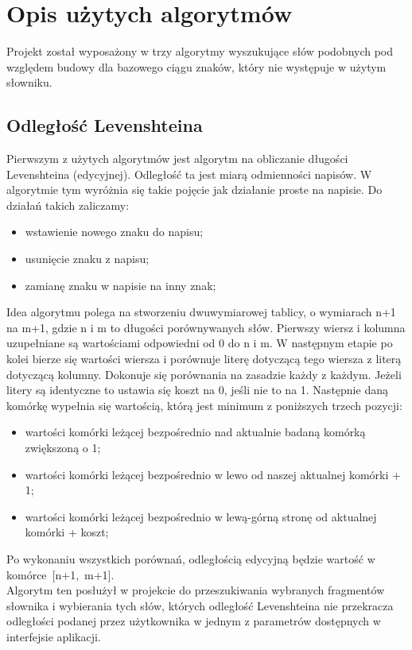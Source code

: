 \chapter{Opis użytych algorytmów}
Projekt został wyposażony w trzy algorytmy wyszukujące słów podobnych pod względem budowy dla bazowego ciągu znaków, który nie występuje w użytym słowniku. 

\section{Odległość Levenshteina} \label{chap:Lev}
Pierwszym z użytych algorytmów jest algorytm na obliczanie długości Levenshteina (edycyjnej). Odległość ta jest miarą odmienności napisów. W algorytmie tym wyróżnia się takie pojęcie jak działanie proste na napisie. Do działań takich zaliczamy:
\begin{itemize}
	\item wstawienie nowego znaku do napisu;
	\item usunięcie znaku z napisu;
	\item zamianę znaku w napisie na inny znak;
\end{itemize}

Idea algorytmu polega na stworzeniu dwuwymiarowej tablicy, o wymiarach n+1 na m+1, gdzie n i m to długości porównywanych słów. Pierwszy wiersz i kolumna uzupełniane są wartościami odpowiedni od 0 do n i m. W następnym etapie po kolei bierze się wartości wiersza i porównuje literę dotyczącą tego wiersza z literą dotyczącą kolumny. Dokonuje się porównania na zasadzie każdy z każdym. Jeżeli litery są identyczne to ustawia się koszt na 0, jeśli nie to na 1. Następnie daną komórkę wypełnia się wartością, którą jest minimum z poniższych trzech pozycji:
\begin{itemize}
	\item wartości komórki leżącej bezpośrednio nad aktualnie badaną komórką zwiększoną o 1;
	\item wartości komórki leżącej bezpośrednio w lewo od naszej aktualnej komórki + 1;
	\item wartości komórki leżącej bezpośrednio w lewą-górną stronę od aktualnej komórki + koszt;
\end{itemize}
Po wykonaniu wszystkich porównań, odległością edycyjną będzie wartość w komórce~[n+1,~m+1]. \\

Algorytm ten posłużył w projekcie do przeszukiwania wybranych fragmentów słownika i wybierania tych słów, których odległość Levenshteina nie przekracza odległości podanej przez użytkownika w jednym z parametrów dostępnych w interfejsie aplikacji.

